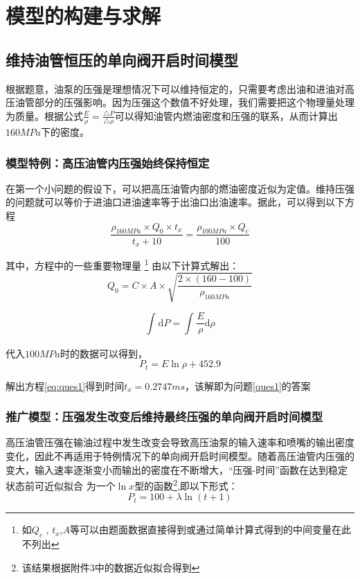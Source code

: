 \documentclass[withoutpreface,bwprint]{cumcmthesis} %
\begin{document}
\section{模型的构建与求解}
\subsection{维持油管恒压的单向阀开启时间模型}\label{model1}
根据题意，油泵的压强是理想情况下可以维持恒定的，只需要考虑出油和进油对高压油管部分的压强影响。因为压强这个数值不好处理，我们需要把这个物理量处理为质量。根据公式$\frac{E}{\rho} = \frac{\triangle P}{\triangle \rho}$可以得知油管内燃油密度和压强的联系，从而计算出$160MPa$下的密度。
\subsubsection{模型特例：高压油管内压强始终保持恒定}\label{case0}
在第一个小问题的假设下，可以把高压油管内部的燃油密度近似为定值。维持压强的问题就可以等价于进油口进油速率等于出油口出油速率。据此，可以得到以下方程
\begin{equation}
	\frac{ \rho_{160MPa}\times Q_{0}\times t_{x}}{t_{x}+10}=\frac{ \rho_{100MPa}\times Q_{c}}{100}\label{eq:ques1}
\end{equation}

其中，方程中的一些重要物理量 \footnote{如$Q_{c}$ , $t_{x}$,$A$等可以由题面数据直接得到或通过简单计算式得到的中间变量在此不列出} 由以下计算式解出：
\begin{equation*}
Q_{0} = C\times A\times \sqrt{\frac{2\times (160-100)}{\rho_{160MPa}}}\label{eq:ques1-1}
\end{equation*}

\begin{equation*}
	\int_{}^{}{\text{d}P} = \int_{}^{} \frac{E}{\rho}{\text{d}\rho}\label{eq:ques1-2}
\end{equation*}

代入$100MPa$时的数据可以得到，
\begin{equation}
P_{t} = E\ln\rho+452.9\label{eq:ques1-3}
\end{equation}



解出方程\cref{eq:ques1}得到时间$t_{x} = 0.2747ms$，该解即为问题\ref{ques1}的答案

\subsubsection{推广模型：压强发生改变后维持最终压强的单向阀开启时间模型}\label{case1}
高压油管压强在输油过程中发生改变会导致高压油泵的输入速率和喷嘴的输出密度变化，因此不再适用于特例情况下的单向阀开启时间模型。随着高压油管内压强的变大，输入速率逐渐变小而输出的密度在不断增大，``压强-时间''函数在达到稳定状态前可近似拟合 为一个$\ln x$型的函数\footnote{该结果根据附件3中的数据近似拟合得到},即以下形式：
\begin{equation}
	P_{t} = 100+\lambda\ln (t+1)\label{eq:ques2}	
\end{equation}
\end{document}
